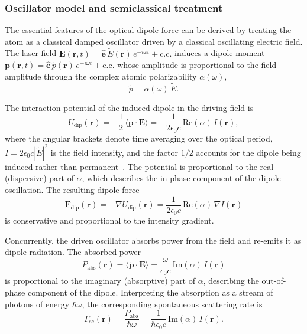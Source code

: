 \subsubsection{Oscillator model and semiclassical treatment}

The essential features of the optical dipole force can be derived by treating the atom as a classical damped oscillator driven by a classical oscillating electric field. The laser field $\mathbf{E}(\mathbf{r},t) = \hat{\mathbf{e}}\,\tilde{E}(\mathbf{r})\,e^{-i\omega t} + \mathrm{c.c.}$ induces a dipole moment $\mathbf{p}(\mathbf{r},t) = \hat{\mathbf{e}}\,\tilde{p}(\mathbf{r})\,e^{-i\omega t} + \mathrm{c.c.}$ whose amplitude is proportional to the field amplitude through the complex atomic polarizability $\alpha(\omega)$,
\begin{equation}
\tilde{p} = \alpha(\omega)\,\tilde{E}.
\label{eq:dipole_amplitude}
\end{equation}

The interaction potential of the induced dipole in the driving field is
\begin{equation}
U_{\mathrm{dip}}(\mathbf{r}) = -\frac{1}{2}\,\langle \mathbf{p}\cdot\mathbf{E}\rangle = -\frac{1}{2\epsilon_0 c}\,\mathrm{Re}(\alpha)\,I(\mathbf{r}),
\label{eq:dipole_potential_general}
\end{equation}
where the angular brackets denote time averaging over the optical period, $I = 2\epsilon_0 c|\tilde{E}|^2$ is the field intensity, and the factor $1/2$ accounts for the dipole being induced rather than permanent~\cite{Grimm:00}. The potential is proportional to the real (dispersive) part of $\alpha$, which describes the in-phase component of the dipole oscillation. The resulting dipole force
\begin{equation}
\mathbf{F}_{\mathrm{dip}}(\mathbf{r}) = -\nabla U_{\mathrm{dip}}(\mathbf{r}) = \frac{1}{2\epsilon_0 c}\,\mathrm{Re}(\alpha)\,\nabla I(\mathbf{r})
\label{eq:dipole_force}
\end{equation}
is conservative and proportional to the intensity gradient.

Concurrently, the driven oscillator absorbs power from the field and re-emits it as dipole radiation. The absorbed power
\begin{equation}
P_{\mathrm{abs}}(\mathbf{r}) = \langle \dot{\mathbf{p}}\cdot\mathbf{E}\rangle = \frac{\omega}{\epsilon_0 c}\,\mathrm{Im}(\alpha)\,I(\mathbf{r})
\label{eq:absorbed_power}
\end{equation}
is proportional to the imaginary (absorptive) part of $\alpha$, describing the out-of-phase component of the dipole. Interpreting the absorption as a stream of photons of energy $\hbar\omega$, the corresponding spontaneous scattering rate is~\cite{Grimm:00}
\begin{equation}
\Gamma_{\mathrm{sc}}(\mathbf{r}) = \frac{P_{\mathrm{abs}}}{\hbar\omega} = \frac{1}{\hbar\epsilon_0 c}\,\mathrm{Im}(\alpha)\,I(\mathbf{r}).
\label{eq:scattering_rate_general}
\end{equation}

